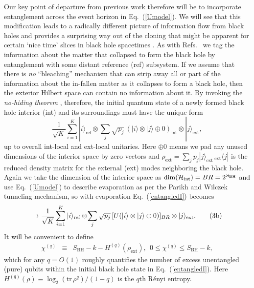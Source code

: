 \documentclass[twocolumn,aps,prl]{revtex4}
\begin{document}
Our key point of departure from previous work \cite{Page93,Hayden07}
therefore will be to incorporate entanglement across the event horizon
in Eq.~(\ref{Umodel}). We will see that this modification leads to a
radically different picture of information flow from black holes and
provides a surprising way out of the cloning \cite{Susskind93} that might
be apparent for certain `nice time' slices in black hole
spacetimes \cite{Lowe95}. As with Refs.~ we tag
the information about the matter that collapsed to form the black hole
by entanglement with some distant reference (ref) subsystem. If we
assume that there is {\it no\/} ``bleaching'' mechanism that can strip
away all or part of the information about the in-fallen matter as
it collapses to form a black hole, then the exterior Hilbert space
can contain no information about it. By invoking the
{\it no-hiding theorem} \cite{me}, therefore, the initial quantum state
of a newly formed black hole interior (int) and its surroundings must
have the unique form
\begin{equation}
\frac{1}{\sqrt{K}}\sum_{i=1}^K |i\rangle_{\text{ref}}\otimes
\sum_{j}\sqrt{p_j}\,(|i\rangle\otimes |j\rangle\oplus 0)_{\text{int}}
\otimes|j\rangle_{\text{ext}}, \tag{3a} \label{entangledI}
\end{equation}
up to overall int-local and ext-local unitaries.
Here $\oplus 0$ means we pad any unused dimensions of the interior
space by zero vectors \cite{me} and
$\rho_{\text{ext}}=\sum_jp_j|j\rangle_{\text{ext}}%
\,{}_{\text{ext}}\!\langle j|$
is the reduced density matrix for the external (ext) modes neighboring 
the black hole. Again we take the dimension of the interior space as
$\text{dim}({\cal H}_\text{int})= BR= 2^{S_{\text{BH}}}$ and use
Eq.~(\ref{Umodel}) to describe evaporation as per the Parikh and Wilczek
tunneling mechanism, so with evaporation Eq.~(\ref{entangledI}) becomes
\begin{equation}
\rightarrow
\frac{1}{\sqrt{K}}\sum_{i=1}^K |i\rangle_{\text{ref}}\otimes
\!\sum_{j}\sqrt{p_j}\,[U(|i\rangle\otimes |j\rangle\oplus 0)]_{BR}
\otimes|j\rangle_{\text{ext}}.
\tag{3b} \label{entangledF}
\setcounter{equation}{3}
\end{equation}
It will be convenient to define
\begin{eqnarray}
\!\!\!\!\!\!\!\!
\chi^{(q)}\!\!&\equiv&\!\! S_{\text{BH}} - k -H^{(q)}(\rho_{\text{ext}}),~~
0\le \chi^{(q)} \le S_{\text{BH}}-k,
\end{eqnarray}
which for any $q=O(1)$ roughly quantifies the number of excess
unentangled (pure) qubits within the initial black hole state in
Eq.~(\ref{entangledI}). Here
$H^{(q)}(\rho) \equiv \log_2({\text{tr}}\, \rho^q)/(1-q)$ is the $q$th
R\'enyi entropy.
\end{document}
